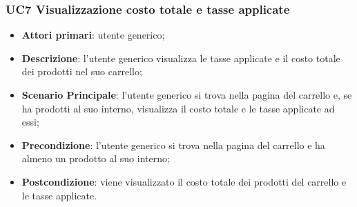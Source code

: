 \subsubsection{UC7 Visualizzazione costo totale e tasse applicate}
\begin{itemize}
\item \textbf{Attori primari}: utente generico;
\item \textbf{Descrizione}: l'utente generico visualizza le tasse applicate e il costo totale dei prodotti nel suo carrello;
\item \textbf{Scenario Principale}: l'utente generico si trova nella pagina del carrello e, se ha prodotti al suo interno, visualizza il costo totale e le tasse applicate ad essi;
\item \textbf{Precondizione}: l'utente generico si trova nella pagina del carrello e ha almeno un prodotto al suo interno;
\item \textbf{Postcondizione}: viene visualizzato il costo totale dei prodotti del carrello e le tasse applicate.
\end{itemize}




